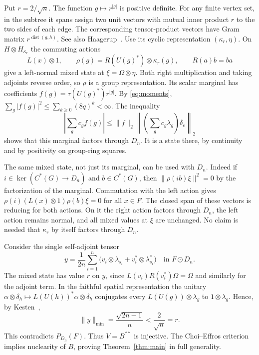 \documentclass[11pt,a4paper]{article}
\begin{document}
Put \(r=2/\sqrt n\). The function \(g\mapsto r^{|g|}\) is positive definite. For any finite vertex set, in the subtree it spans assign two unit vectors with mutual inner product \(r\) to the two sides of each edge. The corresponding tensor-product vectors have Gram matrix \(r^{\operatorname{dist}(g,h)}\). See also Haagerup~\cite[Lemma 1.2]{haag79}. Use its cyclic representation \((\kappa_r,\eta)\). On \(H\otimes H_{\kappa_r}\) the commuting actions
\[
 L(x)\otimes1,\qquad \rho(g)=R(U(g)^*)\otimes\kappa_r(g),
 \qquad R(a)b=ba
\]
give a left-normal mixed state at \(\xi=\Omega\otimes\eta\). Both right multiplication and taking adjoints reverse order, so \(\rho\) is a group representation. Its scalar marginal has coefficients \(f(g)=\tau(U(g)^*)r^{|g|}\). By \eqref{eq:moments}, \(\sum_g|f(g)|^2\le\sum_{k\ge0}(8q)^k<\infty\). The inequality
\[
 \left|\sum_g c_gf(g)\right|
 \le \|f\|_2\left\|\left(\sum_g c_g\lambda_g\right)\delta_e\right\|_2
\]
shows that this marginal factors through \(D_n\). It is a state there, by continuity and by positivity on group-ring squares.

The same mixed state, not just its marginal, can be used with \(D_n\). Indeed if \(i\in\ker(C^*(G)\to D_n)\) and \(b\in C^*(G)\), then \(\|\rho(ib)\xi\|^2=0\) by the factorization of the marginal. Commutation with the left action gives \(\rho(i)(L(x)\otimes1)\rho(b)\xi=0\) for all \(x\in F\). The closed span of these vectors is reducing for both actions. On it the right action factors through \(D_n\), the left action remains normal, and all mixed values at \(\xi\) are unchanged. No claim is needed that \(\kappa_r\) by itself factors through \(D_n\).

Consider the single self-adjoint tensor
\[
 y=\frac{1}{2n}\sum_{i=1}^n
    \big(v_i\otimes\lambda_{s_i}+v_i^*\otimes\lambda_{s_i}^*\big)
    \quad\text{in } F\odot D_n .
\]
The mixed state has value \(r\) on \(y\), since \(L(v_i)R(v_i^*)\Omega=\Omega\) and similarly for the adjoint term. In the faithful spatial representation the unitary \(\alpha\otimes\delta_h\mapsto L(U(h))^*\alpha\otimes\delta_h\) conjugates every \(L(U(g))\otimes\lambda_g\) to \(1\otimes\lambda_g\). Hence, by Kesten~\cite[Theorem 3]{kesten},
\[
  \|y\|_{\min}=\frac{\sqrt{2n-1}}{n}<\frac2{\sqrt n}=r .
\]
This contradicts \(P_{D_n}(F)\). Thus \(V=B^{**}\) is injective. The Choi--Effros criterion~\cite{ce} implies nuclearity of \(B\), proving Theorem~\ref{thm:main} in full generality.
\end{document}
